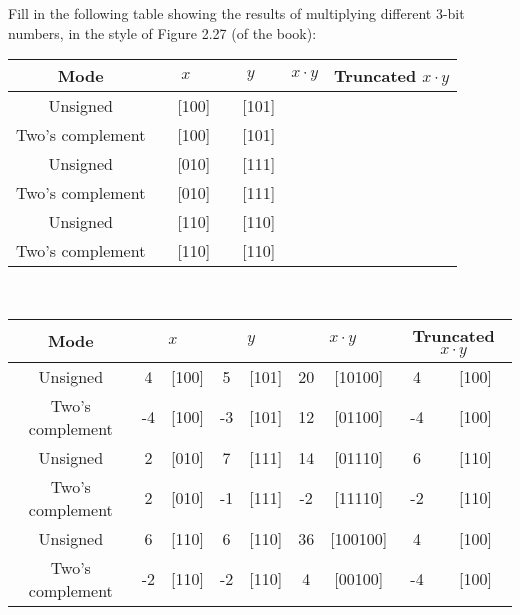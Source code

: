 \documentclass[12pt]{article}
\newenvironment{ex}[2][Exercise]{\begin{trivlist}
		\item[\hskip \labelsep {\bfseries #1}\hskip \labelsep {\bfseries #2.}]}{\end{trivlist}}
\newenvironment{sol}[1][Solution]{\begin{trivlist}
		\item[\hskip \labelsep {\bfseries #1:}]}{\end{trivlist}}
\begin{document}
\begin{ex}{2.34}
	Fill in the following table showing the results of multiplying different 3-bit
	numbers, in the style of Figure 2.27 (of the book):
	\begin{center}
		\begin{tabular}{ccccccccc}
			Mode & \multicolumn{2}{c}{$x$} & \multicolumn{2}{c}{$y$} & \multicolumn{2}{c}{$x\cdot y$}
			& \multicolumn{2}{c}{Truncated $x\cdot y$}\\
			\hline
			Unsigned &  \makebox[1cm]{\hrulefill} & [100] &  \makebox[1cm]{\hrulefill} & [101]
			&  \makebox[1cm]{\hrulefill} &  \makebox[1cm]{\hrulefill} &  \makebox[1cm]{\hrulefill} &  \makebox[1cm]{\hrulefill} \\
			Two's complement &  \makebox[1cm]{\hrulefill} & [100] &  \makebox[1cm]{\hrulefill} & [101]
			&  \makebox[1cm]{\hrulefill} &  \makebox[1cm]{\hrulefill} &  \makebox[1cm]{\hrulefill} &  \makebox[1cm]{\hrulefill} \\
			Unsigned &  \makebox[1cm]{\hrulefill} & [010] &  \makebox[1cm]{\hrulefill} & [111]
			&  \makebox[1cm]{\hrulefill} &  \makebox[1cm]{\hrulefill} &  \makebox[1cm]{\hrulefill} &  \makebox[1cm]{\hrulefill} \\
			Two's complement &  \makebox[1cm]{\hrulefill} & [010] &  \makebox[1cm]{\hrulefill} & [111]
			&  \makebox[1cm]{\hrulefill} &  \makebox[1cm]{\hrulefill} &  \makebox[1cm]{\hrulefill} &  \makebox[1cm]{\hrulefill} \\
			Unsigned &  \makebox[1cm]{\hrulefill} & [110] &  \makebox[1cm]{\hrulefill} & [110]
			&  \makebox[1cm]{\hrulefill} &  \makebox[1cm]{\hrulefill} &  \makebox[1cm]{\hrulefill} &  \makebox[1cm]{\hrulefill} \\
			Two's complement &  \makebox[1cm]{\hrulefill} & [110] &  \makebox[1cm]{\hrulefill} & [110]
			&  \makebox[1cm]{\hrulefill} &  \makebox[1cm]{\hrulefill} &  \makebox[1cm]{\hrulefill} &  \makebox[1cm]{\hrulefill}
		\end{tabular}
	\end{center}
\end{ex}

\begin{sol}
	\
	\begin{center}
		\begin{tabular}{ccccccccc}
			Mode & \multicolumn{2}{c}{$x$} & \multicolumn{2}{c}{$y$} & \multicolumn{2}{c}{$x\cdot y$}
			& \multicolumn{2}{c}{Truncated $x\cdot y$}\\
			\hline
			Unsigned &  4 & [100] &  5 & [101] & 20 & [10100] &  4 &  [100] \\
			Two's complement &  -4 & [100] &  -3 & [101] & 12 &  [01100] & -4 &  [100] \\
			Unsigned &  2 & [010] &  7 & [111] & 14 &  [01110] & 6 &  [110] \\
			Two's complement & 2 & [010] & -1 & [111] & -2 & [11110]  &  -2 &  [110] \\
			Unsigned & 6 & [110] & 6 & [110] & 36 & [100100] & 4 & [100] \\
			Two's complement &  -2 & [110] & -2 & [110] & 4 & [00100] &  -4 &  [100]
		\end{tabular}
	\end{center}
\end{sol}
\end{document}
